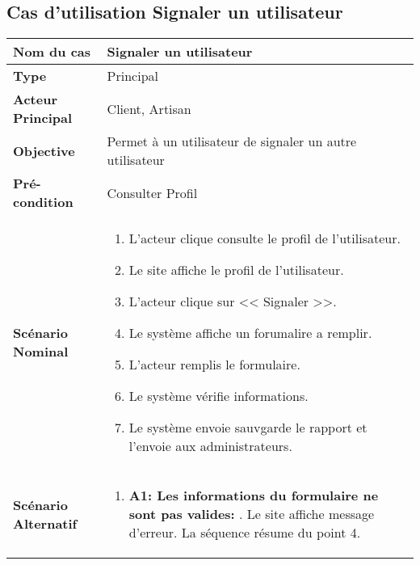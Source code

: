 \subsection{Cas d'utilisation Signaler un utilisateur}
\renewcommand{\arraystretch}{2}
\begin{center}
	\begin{table}[H]
		\centering
		\tiny{\begin{tabular}{ | l | m{0.51\textheight}|}
				\hline
				\rowcolor[HTML]{06a8ed}
				\textbf{Nom du cas} & Signaler un utilisateur \\
				\hline\hline
				\cellcolor[HTML]{99ccff} \textbf{Type} & Principal \\
				\hline
				\cellcolor[HTML]{99ccff} \textbf{Acteur Principal} & Client, Artisan\\
				\hline
				\cellcolor[HTML]{99ccff} \textbf{Objective} & Permet à un utilisateur de signaler un autre utilisateur\\
				\hline
				\cellcolor[HTML]{99ccff} \textbf{Pré-condition} & Consulter Profil\\
				\hline
				\cellcolor[HTML]{99ccff} \textbf{Scénario Nominal} & \parbox{0.43\textheight}{
					\begin{enumerate}
						\vspace{0.01\textheight}
						\item L'acteur clique consulte le profil de l'utilisateur.
						\item Le site affiche le profil de l'utilisateur.
						\item L'acteur clique sur << Signaler >>.
						\item Le système affiche un forumalire a remplir.
						\item L'acteur remplis le formulaire.
						\item Le système vérifie informations.
						\item Le système envoie sauvgarde le rapport et l'envoie aux administrateurs.
						\vspace{0.01\textheight}
				\end{enumerate}}\\
				\hline
				 \textbf{Scénario Alternatif} & \parbox{0.43\textheight}{
					\begin{enumerate}
						\item \textbf{A1: Les informations du formulaire ne sont pas valides:}
						. Le site affiche message d'erreur.\newline						
						La séquence résume du point 4.

\end{enumerate}}
\end{tabular}}
\end{table}
\end{center}
